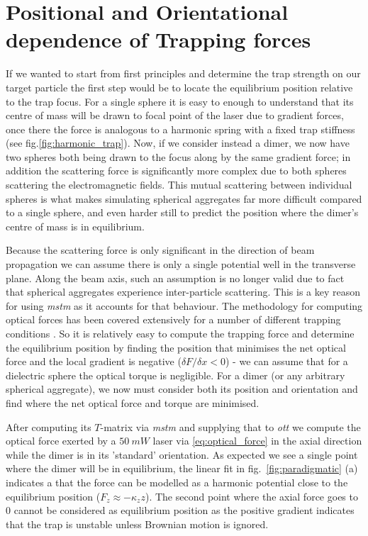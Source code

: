 \section{Positional and Orientational dependence of Trapping forces}
\label{sec:eq_positions}
If we wanted to start from first principles and determine the trap 
strength on our target particle the first step would be to locate the equilibrium position relative to the trap focus. For a single sphere 
it is easy to enough to understand that its centre of mass will be 
drawn to focal point of the laser due to gradient forces, once there 
the force is analogous to a harmonic spring with a fixed trap stiffness 
(see fig.\ref{fig:harmonic_trap}). Now, if we consider instead a dimer, 
we now have two spheres both being drawn to the focus along by the same gradient force; in addition the scattering force is significantly more 
complex due to both spheres scattering the electromagnetic fields. 
This mutual scattering between individual spheres is what makes simulating spherical aggregates far more difficult compared to a single sphere, 
and even harder still to predict the position where the dimer's centre 
of mass is in equilibrium.

Because the scattering force is only significant in the direction of 
beam propagation \cite{Capitanio2002} we can assume there is only a 
single potential well in the transverse plane. Along the beam axis, 
such an assumption is no longer valid due to fact that spherical 
aggregates experience inter-particle scattering. This is a key reason
for using \textit{mstm} as it accounts for that behaviour. The 
methodology for computing optical forces has been covered extensively 
for a number of different trapping conditions \cite{RanhaNeves2019}. 
So it is relatively easy to compute the trapping force and determine 
the equilibrium position by finding the position that minimises the 
net optical force and the local gradient is negative ($\delta F/
\delta x < 0$) - we can assume that for a dielectric sphere the 
optical torque is negligible. For a dimer (or any arbitrary spherical aggregate), we now must consider both its position and orientation 
and find where the net optical force and torque are minimised. 

After computing its $T$-matrix via \textit{mstm} and supplying that 
to \textit{ott} we compute the optical force exerted by a $50\ mW$ laser
via \eqref{eq:optical_force} in the axial direction while the dimer is 
in its 'standard' orientation. As expected we see a single point where 
the dimer will be in equilibrium, the linear fit in fig.~\ref{fig:paradigmatic}
(a) indicates a that the force can be modelled as a harmonic potential close 
to the equilibrium position ($F_z\approx-\kappa_z z$). The second point 
where the axial force goes to 0 cannot be considered as equilibrium position 
as the positive gradient indicates that the trap is unstable unless Brownian 
motion is ignored. 

